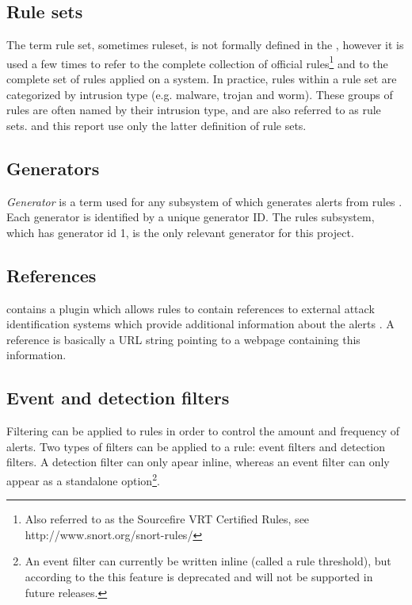 \subsection{Rule sets}

The term rule set, sometimes ruleset, is not formally defined in the
\snortManual, however it is used a few times to refer to
the complete collection of official \snort{} rules\footnote{Also
referred to as the Sourcefire VRT Certified Rules,
see http://www.snort.org/snort-rules/} and to the complete set of rules applied
on a \snort{} system. In practice, rules within a rule set are
categorized by intrusion type (e.g. malware, trojan and worm). These groups of
rules are often named by their intrusion type, and are also referred to as rule
sets. \snowman{} and this report use only the latter definition of rule sets.

\subsection{Generators}

\textit{Generator} is a term used for any subsystem of \snort 
which generates alerts from rules \cite{SnortManual}. Each generator is
identified by a unique generator ID. The rules subsystem, which has generator id
1, is the only relevant generator for this project.

\subsection{References}
\snort{} contains a plugin which allows rules to contain
references to external attack identification systems which provide
additional information about the alerts \cite{SnortManual}. A reference is
basically a URL string pointing to a webpage containing this information.

\subsection{Event and detection filters}
Filtering can be applied to rules in order to control the amount
and frequency of alerts. Two types of filters can be applied to a rule: event
filters and detection filters. A detection filter can only apear inline, whereas
an event filter can only appear as a standalone option\footnote{An event filter
can currently be written inline (called a rule threshold), but according to the
\snortManual{} this feature is deprecated and will not be supported in future
releases.}.

